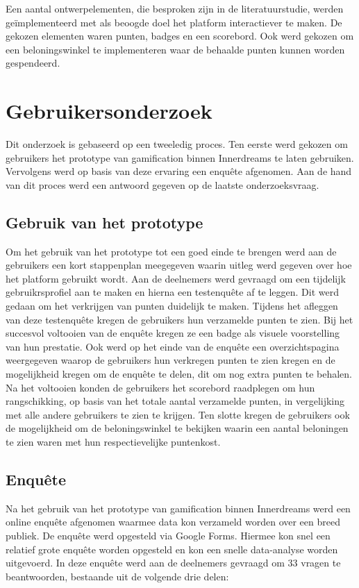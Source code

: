 Een aantal ontwerpelementen, die besproken zijn in de literatuurstudie, werden geïmplementeerd met als beoogde doel het platform interactiever te maken. De gekozen elementen waren punten, badges en een scorebord. Ook werd gekozen om een beloningswinkel te implementeren waar de behaalde punten kunnen worden gespendeerd.

\section{Gebruikersonderzoek}

Dit onderzoek is gebaseerd op een tweeledig proces. Ten eerste werd gekozen om gebruikers het prototype van gamification binnen Innerdreams te laten gebruiken. Vervolgens werd op basis van deze ervaring een enquête afgenomen. Aan de hand van dit proces werd een antwoord gegeven op de laatste onderzoeksvraag.

\subsection{Gebruik van het prototype}

Om het gebruik van het prototype tot een goed einde te brengen werd aan de gebruikers een kort stappenplan meegegeven waarin uitleg werd gegeven over hoe het platform gebruikt wordt. Aan de deelnemers werd gevraagd om een tijdelijk gebruikrsprofiel aan te maken en hierna een testenquête af te leggen. Dit werd gedaan om het verkrijgen van punten duidelijk te maken. Tijdens het afleggen van deze testenquête kregen de gebruikers hun verzamelde punten te zien. Bij het succesvol voltooien van de enquête kregen ze een badge als visuele voorstelling van hun prestatie. Ook werd op het einde van de enquête een overzichtspagina weergegeven waarop de gebruikers hun verkregen punten te zien kregen en de mogelijkheid kregen om de enquête te delen, dit om nog extra punten te behalen. Na het voltooien konden de gebruikers het scorebord raadplegen om hun rangschikking, op basis van het totale aantal verzamelde punten, in vergelijking met alle andere gebruikers te zien te krijgen. Ten slotte kregen de gebruikers ook de mogelijkheid om de beloningswinkel te bekijken waarin een aantal beloningen te zien waren met hun respectievelijke puntenkost.

\subsection{Enquête}

Na het gebruik van het prototype van gamification binnen Innerdreams werd een online enquête afgenomen waarmee data kon verzameld worden over een breed publiek. De enquête werd opgesteld via Google Forms. Hiermee kon snel een relatief grote enquête worden opgesteld en kon een snelle data-analyse worden uitgevoerd. In deze enquête werd aan de deelnemers gevraagd om 33 vragen te beantwoorden, bestaande uit de volgende drie delen:

